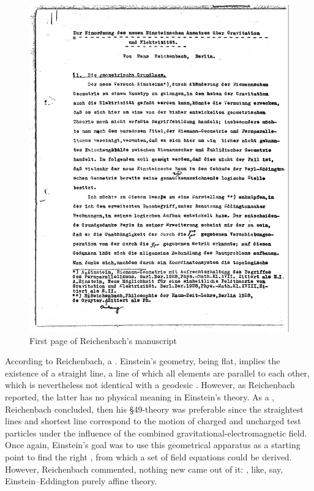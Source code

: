 \documentclass[final]{article}
\newcommand{\manu}[1]{\citep[#1]{Reichenbach1928b}}
\begin{document}
\begin{figure}
\centering
\includegraphics[scale=0.25]{1928ReichebachTele.png}
\caption{\label{fig:reichenbachfirst} First page of Reichenbach's manuscript \citep{Reichenbach1928b}}
\end{figure}

According to Reichenbach, a  \manu{7}. Einstein's geometry, being flat, implies the existence of a straight line, a line of which all elements are parallel to each other, which is nevertheless not identical with a geodesic \citep[224]{Einstein19282}. However, as Reichenbach reported, the latter has no physical meaning in Einstein's theory. As a , Reichenbach concluded, then his \S49-theory was preferable since the straightest lines and shortest line correspond to the motion of charged and uncharged test particles under the influence of the combined gravitational-electromagnetic field. Once again, Einstein's goal was to use this geometrical apparatus as a starting point to find the right , from which a set of field equations could be derived. However, Reichenbach commented, nothing new came out of it:  \manu{6}, like, say, Einstein--Eddington purely affine theory. 
\end{document}
